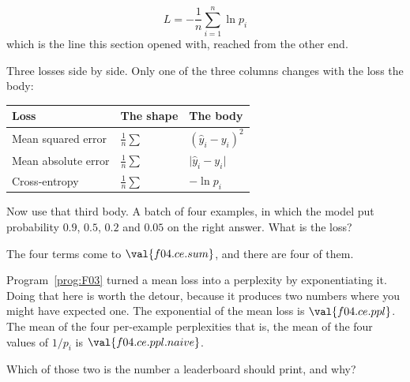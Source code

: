 \begin{fr}
\begin{ansblock}
\[ L = -\frac{1}{n}\sum_{i=1}^{n} \ln p_i \]
which is the line this section opened with, reached from the other end.
\end{ansblock}

Three losses side by side. Only one of the three columns changes with the
loss \dash{} the body:

\begin{center}
\begin{tabular}{lll}
\toprule
Loss & The shape & The body \\
\midrule
Mean squared error & $\frac{1}{n}\sum$ & $(\hat{y}_i - y_i)^{2}$ \\
Mean absolute error & $\frac{1}{n}\sum$ & $\lvert \hat{y}_i - y_i \rvert$ \\
Cross-entropy & $\frac{1}{n}\sum$ & $-\ln p_i$ \\
\bottomrule
\end{tabular}
\end{center}

Now use that third body. A batch of four examples, in which
the model put probability $\num{0.9}$, $\num{0.5}$, $\num{0.2}$ and
$\num{0.05}$ on the right answer. What is the loss?
\dotline
\nextframe
\end{fr}

\begin{fr}
The four terms come to $\val{f04.ce.sum}$, and there are four of them.

Program~\ref{prog:F03} turned a mean loss into a perplexity by exponentiating
it. Doing that here is worth the detour, because it produces two numbers where
you might have expected one. The exponential of the mean loss is
$\val{f04.ce.ppl}$. The mean of the four per-example perplexities \dash{} that
is, the mean of the four values of $1/p_i$ \dash{} is
$\val{f04.ce.ppl.naive}$.

Which of those two is the number a leaderboard should print, and why?
\nextframe
\end{fr}

